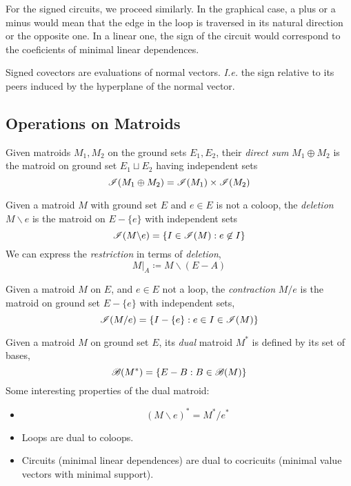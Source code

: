 For the signed circuits, we proceed similarly.
In the graphical case, a plus or a minus would mean that the edge in the loop is traversed in its natural direction or the opposite one.
In a linear one, the sign of the circuit would correspond to the coeficients of minimal linear dependences.

\begin{definition}
    Signed covectors are evaluations of normal vectors.
    \textit{I.e.} the sign relative to its peers induced by the hyperplane of the normal vector.
\end{definition}

\subsection{Operations on Matroids}

\begin{definition}
    Given matroids $M_1, M_2$ on the ground sets $E_1, E_2$, their \textit{direct sum} $M_1 \oplus M_2$ is the matroid on ground set $E_1 \sqcup E_2$ having independent sets
    $$\mathscr{I}(M_1 \oplus M_2) = \mathscr{I}(M_1) \times \mathscr{I}(M_2)$$
\end{definition}

\begin{definition}[Deletion]
    Given a matroid $M$ with ground set $E$ and $e \in E$ is not a coloop, the \textit{deletion} $M \backslash e$ is the matroid on $E - \{ e \}$ with independent sets
    $$\mathscr{I}(M \backslash e) = \lbrace I \in \mathscr{I}(M) : e \not\in I \rbrace$$
    We can express the \textit{restriction} in terms of \textit{deletion},
    $$M|_A \coloneqq M \backslash (E - A)$$
\end{definition}

\begin{definition}[Contraction]
    Given a matroid $M$ on $E$, and $e \in E$ not a loop, the \textit{contraction} $M / e$ is the matroid on ground set $E - \{ e \}$ with independent sets,
    $$\mathscr{I}(M / e) = \{ I - \{ e\}: e \in I \in \mathscr{I}(M) \}$$
\end{definition}

\begin{definition}
    Given a matroid $M$ on ground set $E$, its \textit{dual} matroid $M^*$ is defined by its set of bases,
    $$\mathscr{B}(M^*) = \{ E - B : B \in \mathscr{B}(M) \}$$
    Some interesting properties of the dual matroid:
    \begin{itemize}
        \item $$(M \backslash e )^* = M^* / e^*$$
        \item Loops are dual to coloops.
        \item Circuits (minimal linear dependences) are dual to cocricuits (minimal value vectors with minimal support).
    \end{itemize}
\end{definition}
